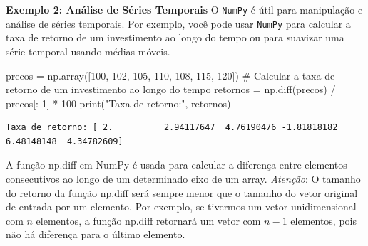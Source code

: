 \documentclass[
  portuguese,
  letterpaper,
  DIV=11,
  numbers=noendperiod]{scrreprt}
\newenvironment{Shaded}{\begin{snugshade}}{\end{snugshade}}
\newcommand{\BuiltInTok}[1]{\textcolor[rgb]{0.00,0.23,0.31}{#1}}
\newcommand{\CommentTok}[1]{\textcolor[rgb]{0.37,0.37,0.37}{#1}}
\newcommand{\DecValTok}[1]{\textcolor[rgb]{0.68,0.00,0.00}{#1}}
\newcommand{\NormalTok}[1]{\textcolor[rgb]{0.00,0.23,0.31}{#1}}
\newcommand{\OperatorTok}[1]{\textcolor[rgb]{0.37,0.37,0.37}{#1}}
\newcommand{\StringTok}[1]{\textcolor[rgb]{0.13,0.47,0.30}{#1}}
\theoremstyle{definition}
\theoremstyle{remark}
\begin{document}
\textbf{Exemplo 2: Análise de Séries Temporais} O \texttt{NumPy} é útil
para manipulação e análise de séries temporais. Por exemplo, você pode
usar \texttt{NumPy} para calcular a taxa de retorno de um investimento
ao longo do tempo ou para suavizar uma série temporal usando médias
móveis.

\begin{Shaded}
\begin{Highlighting}[]
\NormalTok{precos }\OperatorTok{=}\NormalTok{ np.array([}\DecValTok{100}\NormalTok{, }\DecValTok{102}\NormalTok{, }\DecValTok{105}\NormalTok{, }\DecValTok{110}\NormalTok{, }\DecValTok{108}\NormalTok{, }\DecValTok{115}\NormalTok{, }\DecValTok{120}\NormalTok{])}
\CommentTok{\# Calcular a taxa de retorno de um investimento ao longo do tempo}
\NormalTok{retornos }\OperatorTok{=}\NormalTok{ np.diff(precos) }\OperatorTok{/}\NormalTok{ precos[:}\OperatorTok{{-}}\DecValTok{1}\NormalTok{] }\OperatorTok{*} \DecValTok{100}
\BuiltInTok{print}\NormalTok{(}\StringTok{"Taxa de retorno:"}\NormalTok{, retornos)}
\end{Highlighting}
\end{Shaded}

\begin{verbatim}
Taxa de retorno: [ 2.          2.94117647  4.76190476 -1.81818182  6.48148148  4.34782609]
\end{verbatim}

\begin{tcolorbox}[enhanced jigsaw, leftrule=.75mm, opacitybacktitle=0.6, colback=white, coltitle=black, colframe=quarto-callout-tip-color-frame, titlerule=0mm, left=2mm, opacityback=0, breakable, bottomtitle=1mm, toprule=.15mm, title=\textcolor{quarto-callout-tip-color}{\faLightbulb}\hspace{0.5em}{Dica}, colbacktitle=quarto-callout-tip-color!10!white, arc=.35mm, rightrule=.15mm, bottomrule=.15mm, toptitle=1mm]

A função np.diff em NumPy é usada para calcular a diferença entre
elementos consecutivos ao longo de um determinado eixo de um array.
\emph{Atenção}: O tamanho do retorno da função np.diff será sempre menor
que o tamanho do vetor original de entrada por um elemento. Por exemplo,
se tivermos um vetor unidimensional com \(n\) elementos, a função
np.diff retornará um vetor com \(n−1\) elementos, pois não há diferença
para o último elemento.

\end{tcolorbox}
\end{document}
